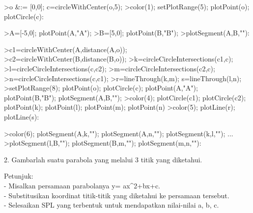 \documentclass[12pt,Times new roman,letterpaper]{book}
\begin{document}
\begin{eulernootebook}
\begin{eulercomment}
\begin{eulercomment}
\begin{eulernootebook}
\begin{eulercomment}
\begin{eulercomment}
\begin{eulercomment}
\begin{eulercomment}
\begin{eulercomment}
\begin{eulercomment}
\begin{eulernotebook}
\begin{eulercomment}
\begin{eulercomment}
\begin{eulercomment}
\begin{eulercomment}
\begin{eulercomment}
\begin{eulercomment}
\end{eulercomment}
\eulersubheading{}
\begin{eulercomment}
\end{eulercomment}
\begin{eulerprompt}
>o &:= [0,0]; c=circleWithCenter(o,5);
>color(1); setPlotRange(5); plotPoint(o); plotCircle(c):
\end{eulerprompt}
\begin{eulerprompt}
>A=[-5,0]; plotPoint(A,"A");
>B=[5,0]; plotPoint(B,"B");
>plotSegment(A,B,""):
\end{eulerprompt}
\begin{eulerprompt}
>c1=circleWithCenter(A,distance(A,o));
>c2=circleWithCenter(B,distance(B,o));
>k=circleCircleIntersections(c1,c);
>l=circleCircleIntersections(c,c2);
>m=circleCircleIntersections(c2,c);
>n=circleCircleIntersections(c,c1);
>r=lineThrough(k,m); s=lineThrough(l,n);
>setPlotRange(8); plotPoint(o); plotCircle(c); plotPoint(A,"A"); plotPoint(B,"B"); plotSegment(A,B,"");
>color(4); plotCircle(c1); plotCircle(c2); plotPoint(k); plotPoint(l); plotPoint(m); plotPoint(n)
>color(5); plotLine(r); plotLine(s):
\end{eulerprompt}
\begin{eulerprompt}
>color(6); plotSegment(A,k,""); plotSegment(A,n,""); plotSegment(k,l,""); ...
>plotSegment(l,B,""); plotSegment(B,m,""); plotSegment(m,n,""):
\end{eulerprompt}
\begin{eulercomment}
2. Gambarlah suatu parabola yang melalui 3 titik yang diketahui.

Petunjuk:\\
- Misalkan persamaan parabolanya y= ax\textasciicircum{}2+bx+c.\\
- Substitusikan koordinat titik-titik yang diketahui ke persamaan
tersebut.\\
- Selesaikan SPL yang terbentuk untuk mendapatkan nilai-nilai a, b, c.


\end{eulercomment}
\end{eulercomment}
\end{eulercomment}
\end{eulercomment}
\end{eulercomment}
\end{eulercomment}
\end{eulernotebook}
\end{eulercomment}
\end{eulercomment}
\end{eulercomment}
\end{eulercomment}
\end{eulercomment}
\end{eulercomment}
\end{eulernootebook}
\end{eulercomment}
\end{eulercomment}
\end{eulernootebook}
\end{document}
